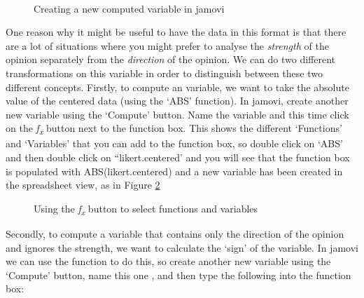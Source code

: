  \\

\begin{figure}[h!!]
\begin{center}
\caption{Creating a new computed variable in jamovi}
\label{fig:likertraw}
\HR
\end{center}
\end{figure}

One reason why it might be useful to have the data in this format is that there are a lot of situations where you might prefer to analyse the {\it strength} of the opinion separately from the {\it direction} of the opinion. We can do two different transformations on this  variable in order to distinguish between these two different concepts. Firstly, to compute an  variable, we want to take the absolute value of the centered data (using the `ABS' function). In jamovi, create another new variable using the `Compute' button. Name the variable  and this time click on the {\it f\textsubscript{x}} button next to the function box. This shows the different `Functions' and `Variables' that you can add to the function box, so double click on `ABS' and then double click on ``likert.centered' and you will see that the function box is populated with ABS(likert.centered) and a new variable has been created in the spreadsheet view, as in Figure \ref{fig:opinionstrength}

\begin{figure}[h!!]
\begin{center}
\caption{Using the {\it f\textsubscript{x}} button to select functions and variables}
\label{fig:opinionstrength}
\HR
\end{center}
\end{figure}


Secondly, to compute a variable that contains only the direction of the opinion and ignores the strength, we want to calculate the `sign' of the variable. In jamovi we can use the  function to do this, so create another new variable using the `Compute' button, name this one , and then type the following into the function box: \\


 \\


